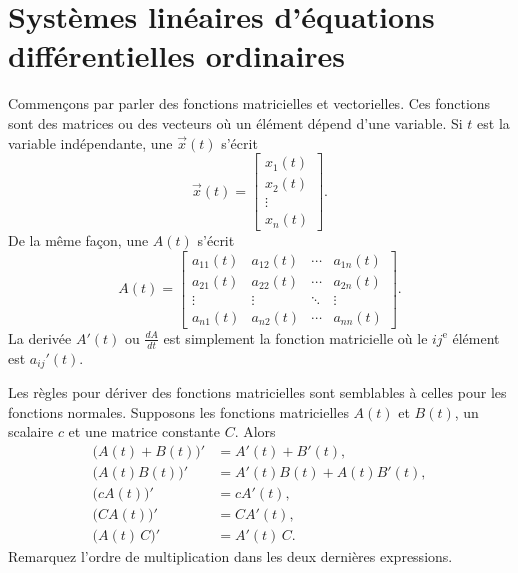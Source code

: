
\sectionnewpage
\section{Systèmes linéaires d'équations différentielles ordinaires}
\label{linsystems:section}


Commençons par parler des fonctions matricielles et vectorielles. Ces fonctions sont des matrices ou des vecteurs où un élément dépend d'une variable. Si $t$ est la variable indépendante, une
\emph{}
$\vec{x}(t)$ s'écrit
\begin{equation*}
\vec{x}(t) = \begin{bmatrix}
x_1(t) \\
x_2(t) \\
\vdots \\
x_n(t)
\end{bmatrix} .
\end{equation*}
De la même façon, une \emph{} $A(t)$ s'écrit
\begin{equation*}
A(t) =
\begin{bmatrix}
a_{11}(t) & a_{12}(t) & \cdots & a_{1n}(t) \\
a_{21}(t) & a_{22}(t) & \cdots & a_{2n}(t) \\
\vdots & \vdots & \ddots & \vdots \\
a_{n1}(t) & a_{n2}(t) & \cdots & a_{nn}(t)
\end{bmatrix} .
\end{equation*}
La derivée $A'(t)$ ou $\frac{dA}{dt}$ est simplement la fonction matricielle où le $ij^{\text{e}}$ élément est $a_{ij}'(t)$.

Les règles pour dériver des fonctions matricielles sont semblables à celles pour les fonctions normales. Supposons les fonctions matricielles $A(t)$ et $B(t)$, un scalaire $c$ et une matrice constante $C$.
Alors
\begin{align*}
\bigl(A(t)+B(t)\bigr)' & = A'(t) + B'(t), \\
\bigl(A(t)B(t)\bigr)' & = A'(t)B(t) + A(t)B'(t), \\
\bigl(cA(t)\bigr)' & = cA'(t), \\
\bigl(CA(t)\bigr)' & = CA'(t), \\
\bigl(A(t)\,C\bigr)' & = A'(t)\,C .
\end{align*}
Remarquez l’ordre de multiplication dans les deux dernières expressions.

